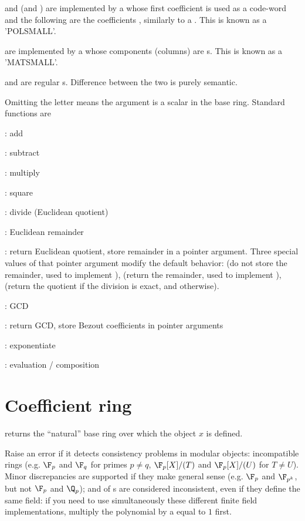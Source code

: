    and  (and ) are implemented by a  whose
  first coefficient is used as a code-word and the following are the
  coefficients , similarly to a . This is known as a 'POLSMALL'.

   are implemented by a  whose components (columns) are
  s. This is known as a 'MATSMALL'.

   and  are regular s. Difference between the
  two is purely semantic.

\noindent Omitting the letter means the argument is a scalar in the base
ring. Standard functions  are

  : add

  : subtract

  : multiply

  : square

  : divide (Euclidean quotient)

  : Euclidean remainder

  : return Euclidean quotient, store remainder in a pointer
argument. Three special values of that pointer argument modify the default
behavior:  (do not store the remainder, used to implement
),  (return the remainder, used to implement
),  (return the quotient if the division is exact,
and  otherwise).

  : GCD

  : return GCD, store Bezout coefficients in pointer arguments

  : exponentiate

  : evaluation / composition

\section{Coefficient ring}

 returns
the ``natural'' base ring over which the object $x$ is defined.

Raise an error if it detects consistency problems in modular objects:
incompatible rings (e.g. $\F_p$ and $\F_q$ for primes $p\neq q$,
$\F_p[X]/(T)$ and $\F_p[X]/(U)$ for $T\neq U$). Minor discrepancies are
supported if they make general sense (e.g. $\F_p$ and $\F_{p^k}$, but not
$\F_p$ and $\Q_p$);  and  of s are
considered inconsistent, even if they define the same field: if you need to
use simultaneously these different finite field implementations, multiply the
polynomial by a  equal to $1$ first.

